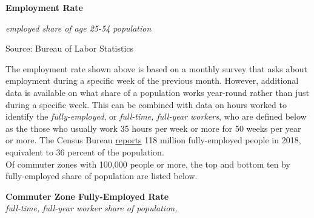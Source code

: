 \documentclass{report}
\makeatletter
\newcommand{\tbllink}[1]{\href{https://raw.githubusercontent.com/bdecon/US-chartbook/master/chartbook/data/#1}{\faTable}}
\newcommand*\short[1]{\expandafter\@gobbletwo\number\numexpr#1\relax}
\newcommand{\dateaxisticks}{
		date coordinates in=x, axis line style={draw=none},
		xmax={2020-08-10},
		max space between ticks=40,	    
		xtick={{1990-01-01}, {1992-01-01}, {1994-01-01}, 
			{1996-01-01}, {1998-01-01}, {2000-01-01}, 
			{2002-01-01}, {2004-01-01}, {2006-01-01},
			{2008-01-01}, {2010-01-01}, {2012-01-01}, {2014-01-01},
		    {2016-01-01}, {2018-01-01}, {2020-01-01}},
		minor xtick={{1989-01-01}, {1991-01-01}, {1993-01-01},
			{1995-01-01}, {1997-01-01}, {1999-01-01}, 
			{2001-01-01}, {2003-01-01}, {2005-01-01}, {2007-01-01},
		    {2009-01-01}, {2011-01-01}, {2013-01-01}, {2015-01-01},
		    {2017-01-01}, {2019-01-01}},
		enlarge y limits={0.06}, enlarge x limits={0.01},
		}
\newcommand{\bbar}[2]{extra #1 ticks = {{#2}}, extra #1 tick labels = ,
		extra #1 tick style = {grid=major, grid style={thick, black!25}},}
\newcommand{\stdline}[4]{\addplot[very thick, no markers, color=#1] 
		table [x=#2, y=#3, col sep=comma] {#4};	}
\newcommand{\rbars}{
		\fill[color=black!10] (axis cs:{1990-07-01},\pgfkeysvalueof{/pgfplots/ymin}) rectangle 
			(axis cs:{1991-03-01}, \pgfkeysvalueof{/pgfplots/ymax});
		\fill[color=black!10] (axis cs:{2007-12-01},\pgfkeysvalueof{/pgfplots/ymin}) rectangle 
			(axis cs:{2009-07-01}, \pgfkeysvalueof{/pgfplots/ymax});
		\fill[color=black!10] (axis cs:{2001-03-01},\pgfkeysvalueof{/pgfplots/ymin}) rectangle 
			(axis cs:{2001-11-01}, \pgfkeysvalueof{/pgfplots/ymax});
		\fill[color=black!10] (axis cs:{2020-02-01},\pgfkeysvalueof{/pgfplots/ymin}) rectangle 
			(axis cs:{2020-09-01}, \pgfkeysvalueof{/pgfplots/ymax});}
\makeatother
\begin{document}
{{{{{{\begin{minipage}{0.76\textwidth}
\normalsize \textbf{Employment Rate}

\footnotesize{\textit{employed share of age 25-54 population}}

\noindent \hspace*{-2mm} 

\footnotesize{Source: Bureau of Labor Statistics} \hfill \tbllink{epop.csv}

\vspace{6mm}

\small The employment rate shown above is based on a monthly survey that asks about employment during a specific week of the previous month. However, additional data is available on what share of a population works year-round rather than just during a specific week. This can be combined with data on hours worked to identify the \textit{fully-employed}, or \textit{full-time, full-year workers}, who are defined below as the those who usually work 35 hours per week or more for 50 weeks per year or more. The Census Bureau \href{https://www.census.gov/data/tables/time-series/demo/income-poverty/cps-pinc/pinc-01.html#par_textimage_14}{reports} 118 million fully-employed people in 2018, equivalent to 36 percent of the population. \\

 Of commuter zones with 100,000 people or more, the top and bottom ten by fully-employed share of population are listed below.
\end{minipage}

\vspace{3mm}

\begin{minipage}{0.52\textwidth}


\noindent \normalsize \textbf{Commuter Zone Fully-Employed Rate}\\
\footnotesize{\textit{full-time, full-year worker share of population, }}\\

\vspace{-3mm}


\end{minipage}}}}}}}
\end{document}
